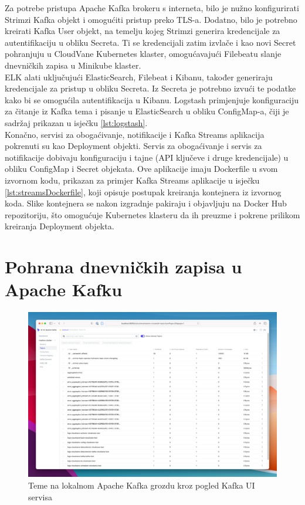 \documentclass[times, utf8, diplomski]{fer}
\begin{document}
Za potrebe pristupa Apache Kafka brokeru s interneta, bilo je nužno konfigurirati Strimzi Kafka objekt i omogućiti pristup preko TLS-a. Dodatno, bilo je potrebno kreirati Kafka User objekt, na temelju kojeg Strimzi generira kredencijale za autentifikaciju u obliku Secreta. Ti se kredencijali zatim izvlače i kao novi Secret pohranjuju u CloudVane Kubernetes klaster, omogućavajući Filebeatu slanje dnevničkih zapisa u Minikube klaster.\\

ELK alati uključujući ElasticSearch, Filebeat i Kibanu, također generiraju kredencijale za pristup u obliku Secreta. Iz Secreta je potrebno izvući te podatke kako bi se omogućila autentifikacija u Kibanu. Logstash primjenjuje konfiguraciju za čitanje iz Kafka tema i pisanje u ElasticSearch u obliku ConfigMap-a, čiji je sadržaj prikazan u isječku \ref{lst:logstash}.\\

Konačno, servisi za obogaćivanje, notifikacije i Kafka Streams aplikacija pokrenuti su kao Deployment objekti. Servis za obogaćivanje i servis za notifikacije dobivaju konfiguraciju i tajne (API ključeve i druge kredencijale) u obliku ConfigMap i Secret objekata. Ove aplikacije imaju Dockerfile u svom izvornom kodu, prikazan za primjer Kafka Streams aplikacije u isječku \ref{lst:streamsDockerfile}, koji opisuje postupak kreiranja kontejnera iz izvornog koda. Slike kontejnera se nakon izgradnje pakiraju i objavljuju na Docker Hub repozitoriju, što omogućuje Kubernetes klasteru da ih preuzme i pokrene prilikom kreiranja Deployment objekta.

\section{Pohrana dnevničkih zapisa u Apache Kafku}
\label{sec:kafkaImpl}

\begin{figure}[htb]
	\centering
	\includegraphics[width=15cm]{images/kafka-ui.png}
	\caption[Teme na lokalnom Apache Kafka grozdu kroz pogled Kafka UI servisa]{Teme  na lokalnom Apache Kafka grozdu kroz pogled Kafka UI servisa}
	\label{fig:kafkaui}
\end{figure}
\end{document}

